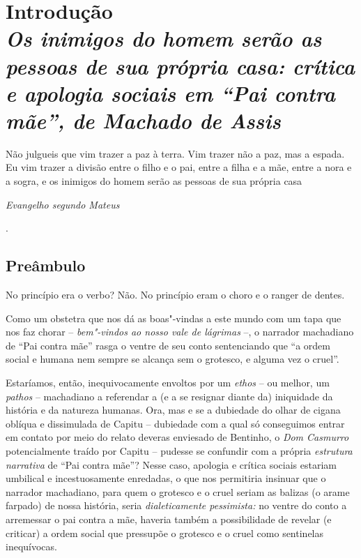 
\chapter*{Introdução\\
\bigskip
\emph{Os inimigos do homem serão as pessoas de sua própria casa: crítica e apologia sociais em ``Pai contra mãe'', de Machado de
Assis}}



\epigraph{Não julgueis que vim trazer a paz à terra. Vim trazer não a paz, mas a
espada. Eu vim trazer a divisão entre o filho e o pai, entre a filha e a
mãe, entre a nora e a sogra, e os inimigos do homem serão as pessoas de
sua própria casa}{\emph{Evangelho segundo Mateus\footnotemark}}
.

\section{Preâmbulo}

\noindent No princípio era o verbo? Não. No princípio eram o choro e o ranger de
dentes.

Como um obstetra que nos dá as boas"-vindas a este mundo com um tapa que
nos faz chorar -- \emph{bem"-vindos ao nosso vale de lágrimas} --, o
narrador machadiano de ``Pai contra mãe'' rasga o ventre de seu conto
sentenciando que ``a ordem social e humana nem sempre se alcança sem o
grotesco, e alguma vez o cruel''.

Estaríamos, então, inequivocamente envoltos por um \emph{ethos} -- ou
melhor, um \emph{pathos} -- machadiano a referendar a (e a se resignar
diante da) iniquidade da história e da natureza humanas. Ora, mas e se a
dubiedade do olhar de cigana oblíqua e dissimulada de Capitu --
dubiedade com a qual só conseguimos entrar em contato por meio do relato
deveras enviesado de Bentinho, o \emph{Dom Casmurro} potencialmente
traído por Capitu -- pudesse se confundir com a própria \emph{estrutura
narrativa} de ``Pai contra mãe''? Nesse caso, apologia e crítica sociais
estariam umbilical e incestuosamente enredadas, o que nos permitiria
insinuar que o narrador machadiano, para quem o grotesco e o cruel
seriam as balizas (o arame farpado) de nossa história, seria
\emph{dialeticamente pessimista:} no ventre do conto a arremessar o pai
contra a mãe, haveria também a possibilidade de revelar (e criticar) a
ordem social que pressupõe o grotesco e o cruel como sentinelas
inequívocas.

